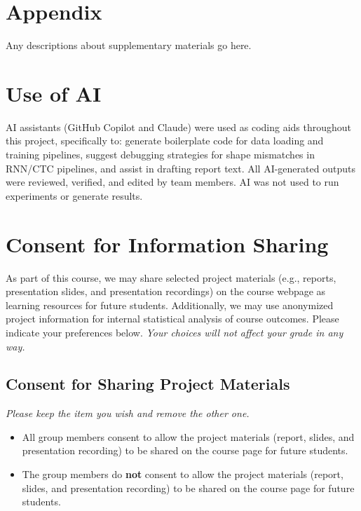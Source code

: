 \documentclass{article}
\begin{document}



\section*{Appendix}
Any descriptions about supplementary materials go here.


\newpage
\section*{Use of AI}
AI assistants (GitHub Copilot and Claude) were used as coding aids throughout this project, specifically to: generate boilerplate code for data loading and training pipelines, suggest debugging strategies for shape mismatches in RNN/CTC pipelines, and assist in drafting report text. All AI-generated outputs were reviewed, verified, and edited by team members. AI was not used to run experiments or generate results.

\section*{Consent for Information Sharing}
As part of this course, we may share selected project materials (e.g., reports, presentation slides, and presentation recordings) on the course webpage as learning resources for future students. Additionally, we may use anonymized project information for internal statistical analysis of course outcomes. Please indicate your preferences below. \textit{Your choices will not affect your grade in any way.}

\subsection*{Consent for Sharing Project Materials}
\textit{Please keep the item you wish and remove the other one.}

\begin{itemize}
	\item All group members consent to allow the project materials (report, slides, and presentation recording) to be shared on the course page for future students.
	\item The group members do \textbf{not} consent to allow the project materials (report, slides, and presentation recording) to be shared on the course page for future students.
\end{itemize}
\end{document}
